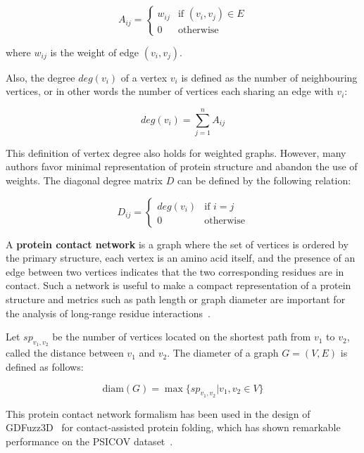         \begin{equation}
            A_{ij} =
                \begin{cases}
                    w_{ij} & \text{if } (v_i, v_j) \in E \\
                    0 & \text{otherwise}
                \end{cases}
        \end{equation}

        where $w_{ij}$ is the weight of edge $(v_i, v_j)$.

        Also, the degree $deg(v_i)$ of a vertex $v_i$ is defined as the number of neighbouring vertices, or in other
        words the number of vertices each sharing an edge with $v_i$:

        \begin{equation}
            deg(v_i) = \sum\limits_{j=1}^{n} A_{ij}
        \end{equation}

        This definition of vertex degree also holds for weighted graphs. However, many authors favor minimal representation of protein structure
        and abandon the use of weights. The diagonal degree matrix $D$ can be defined by the following relation:

        \begin{equation}
            D_{ij} =
                \begin{cases}
                    deg(v_i) & \text{if } i = j \\
                    0 & \text{otherwise}
                \end{cases}
        \end{equation}

        A \textbf{protein contact network} is a graph where the set of vertices is ordered by the primary structure, each vertex is an amino acid itself,
        and the presence of an edge between two vertices indicates that the two corresponding residues are in contact. Such a network is useful to make a compact
        representation of a protein structure and metrics such as path length or graph diameter are important for the analysis of long-range residue
        interactions~\cite{doi:10.1021/cr3002356}.

        Let $sp_{v_1,v_2}$ be the number of vertices located on the shortest path from $v_1$ to $v_2$, called the distance between $v_1$ and $v_2$.
        The diameter of a graph $G = (V, E)$ is defined as follows:

        \begin{equation}
            \text{diam}(G) = \max \{ sp_{v_1, v_2} | v_1, v_2 \in V \}
        \end{equation}

        This protein contact network formalism has been used in the design of GDFuzz3D~\cite{pietal2015gdfuzz3d}
        for contact-assisted protein folding, which has shown remarkable performance on the PSICOV
        dataset~\cite{doi:10.1093/bioinformatics/btr638}.
